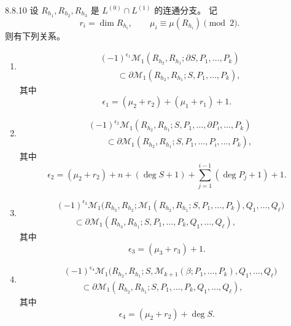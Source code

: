 \begin{theorem}{8.8.10}\label{thm:8-8-10}
设 $R_{h_1},R_{h_2},R_{h_3}$ 是
$L^{(0)}\cap L^{(1)}$ 的连通分支。%
记
\[
 r_i=\dim R_{h_i},\qquad
 \mu_i\equiv\mu(R_{h_i})\pmod2.
\]
则有下列关系。
\begin{enumerate}[label=(\arabic*),leftmargin=2.8em]
\item
\[
\begin{aligned}
 &(-1)^{\epsilon_1}
 \mathcal M_1
 (R_{h_2},R_{h_1};\partial S,P_1,\ldots,P_k)\\
 &\qquad\subset
 \partial\mathcal M_1
 (R_{h_2},R_{h_1};S,P_1,\ldots,P_k),
\end{aligned}
\]
其中
\[
 \epsilon_1=(\mu_2+r_2)+(\mu_1+r_1)+1.
\]

\item
\[
\begin{aligned}
 &(-1)^{\epsilon_2}
 \mathcal M_1
 (R_{h_2},R_{h_1};
 S,P_1,\ldots,\partial P_i,\ldots,P_k)\\
 &\qquad\subset
 \partial\mathcal M_1
 (R_{h_2},R_{h_1};S,P_1,\ldots,P_i,\ldots,P_k),
\end{aligned}
\]
其中
\[
 \epsilon_2=(\mu_2+r_2)+n+(\deg S+1)
 +\sum_{j=1}^{i-1}(\deg P_j+1)+1.
\]

\item
\[
\begin{aligned}
 &(-1)^{\epsilon_3}
 \mathcal M_1\bigl(
 R_{h_3},R_{h_2};
 \mathcal M_1(R_{h_2},R_{h_1};S,P_1,\ldots,P_k),
 Q_1,\ldots,Q_\ell
 \bigr)\\
 &\qquad\subset
 \partial\mathcal M_1
 (R_{h_3},R_{h_1};
 S,P_1,\ldots,P_k,Q_1,\ldots,Q_\ell),
\end{aligned}
\]
其中
\[
 \epsilon_3=(\mu_3+r_3)+1.
\]

\item
\[
\begin{aligned}
 &(-1)^{\epsilon_4}
 \mathcal M_1\bigl(
 R_{h_2},R_{h_1};
 S,\mathcal M_{k+1}(\beta;P_1,\ldots,P_k),
 Q_1,\ldots,Q_\ell
 \bigr)\\
 &\qquad\subset
 \partial\mathcal M_1
 (R_{h_2},R_{h_1};
 S,P_1,\ldots,P_k,Q_1,\ldots,Q_\ell),
\end{aligned}
\]
其中
\[
 \epsilon_4=(\mu_2+r_2)+\deg S.
\]
\end{enumerate}
\end{theorem}


